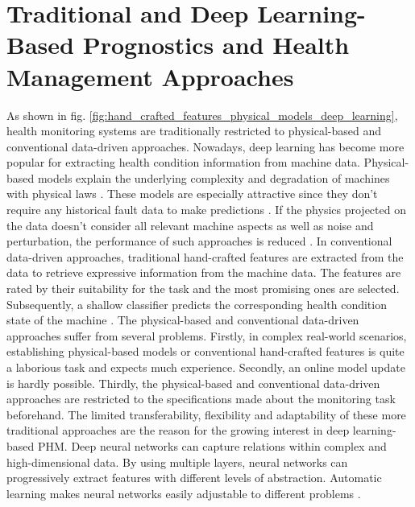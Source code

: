 \section{Traditional and Deep Learning-Based Prognostics and Health Management Approaches}
As shown in fig. \ref{fig:hand_crafted_features_physical_models_deep_learning}, health monitoring systems are traditionally restricted to physical-based and conventional data-driven approaches. Nowadays, deep learning has become more popular for extracting health condition information from machine data. Physical-based models explain the underlying complexity and degradation of machines with physical laws \cite{ZHAO2019213}. These models are especially attractive since they don't require any historical fault data to make predictions \cite{Benker2019}. If the physics projected on the data doesn't consider all relevant machine aspects as well as noise and perturbation, the performance of such approaches is reduced \cite{ZHAO2019213}. In conventional data-driven approaches, traditional hand-crafted features are extracted from the data to retrieve expressive information from the machine data. The features are rated by their suitability for the task and the most promising ones are selected. Subsequently, a shallow classifier predicts the corresponding health condition state of the machine \cite{ZHAO2019213}. The physical-based and conventional data-driven approaches suffer from several problems. Firstly, in complex real-world scenarios, establishing physical-based models or conventional hand-crafted features is quite a laborious task and expects much experience. Secondly, an online model update is hardly possible. Thirdly, the physical-based and conventional data-driven approaches are restricted to the specifications made about the monitoring task beforehand. The limited transferability, flexibility and adaptability of these more traditional approaches are the reason for the growing interest in deep learning-based PHM. Deep neural networks can capture relations within complex and high-dimensional data. By using multiple layers, neural networks can progressively extract features with different levels of abstraction. Automatic learning makes neural networks easily adjustable to different problems \cite{ZHAO2019213}.
